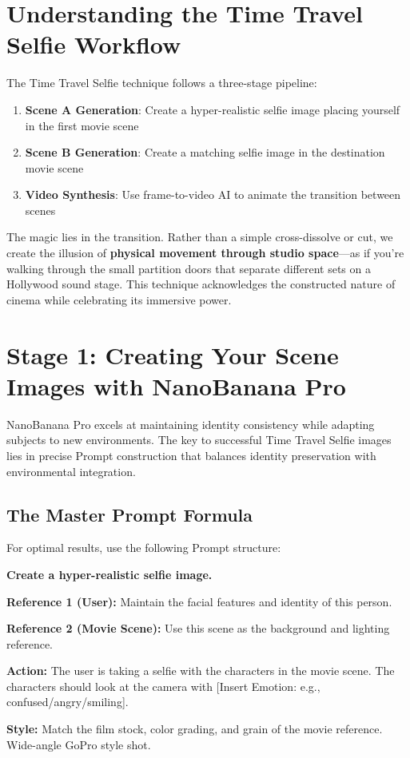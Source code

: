 \section{Understanding the Time Travel Selfie Workflow}
\label{sec:time-travel-workflow}

The Time Travel Selfie technique follows a three-stage pipeline:

\begin{enumerate}
\item \textbf{Scene A Generation}: Create a hyper-realistic selfie image placing yourself in the first movie scene
\item \textbf{Scene B Generation}: Create a matching selfie image in the destination movie scene
\item \textbf{Video Synthesis}: Use frame-to-video AI to animate the transition between scenes
\end{enumerate}

The magic lies in the transition. Rather than a simple cross-dissolve or cut, we create the illusion of \textbf{physical movement through studio space}—as if you're walking through the small partition doors that separate different sets on a Hollywood sound stage. This technique acknowledges the constructed nature of cinema while celebrating its immersive power.

\section{Stage 1: Creating Your Scene Images with NanoBanana Pro}
\label{sec:nanobanana-generation}

NanoBanana Pro excels at maintaining identity consistency while adapting subjects to new environments. The key to successful Time Travel Selfie images lies in precise Prompt construction that balances identity preservation with environmental integration.

\subsection{The Master Prompt Formula}

For optimal results, use the following Prompt structure:

\begin{Prompt}
\textbf{Create a hyper-realistic selfie image.}

\textbf{Reference 1 (User):} Maintain the facial features and identity of this person.

\textbf{Reference 2 (Movie Scene):} Use this scene as the background and lighting reference.

\textbf{Action:} The user is taking a selfie with the characters in the movie scene. The characters should look at the camera with [Insert Emotion: e.g., confused/angry/smiling].

\textbf{Style:} Match the film stock, color grading, and grain of the movie reference. Wide-angle GoPro style shot.
\end{Prompt}

